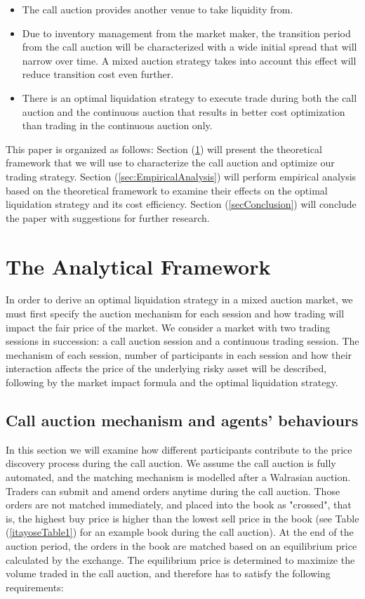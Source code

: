 \documentclass{article}
\begin{document}
\begin{itemize}
  \item The call auction provides another venue to take liquidity from.
  \item Due to inventory management from the market maker, the transition period from the call auction will be characterized with a wide initial spread that will narrow over time. A mixed auction strategy takes into account this effect will reduce transition cost even further.
  \item There is an optimal liquidation strategy to execute trade during both the call auction and the continuous auction that results in better cost optimization than trading in the continuous auction only.
\end{itemize}

This paper is organized as follows: Section (\ref{sec:AnalyticalFramework}) will present the theoretical framework that we will use to characterize the call auction and optimize our trading strategy. Section (\ref{sec:EmpiricalAnalysis}) will perform empirical analysis based on the theoretical framework to examine their effects on the optimal liquidation strategy and its cost efficiency. Section (\ref{secConclusion}) will conclude the paper with suggestions for further research.

\section{The Analytical Framework}\label{sec:AnalyticalFramework}

In order to derive an optimal liquidation strategy in a mixed auction market, we must first specify the auction mechanism for each session and how trading will impact the fair price of the market. We consider a market with two trading sessions in succession: a call auction session and a continuous trading session. The mechanism of each session, number of participants in each session and how their interaction affects the price of the underlying risky asset will be described, following by the market impact formula and the optimal liquidation strategy.

\subsection{Call auction mechanism and agents' behaviours}\label{subsec:AnalyticalFrameworkCallAuction}

In this section we will examine how different participants contribute to the price discovery process during the call auction. We assume the call auction is fully automated, and the matching mechanism is modelled after a Walrasian auction. Traders can submit and amend orders anytime during the call auction. Those orders are not matched immediately, and placed into the book as "crossed", that is, the highest buy price is higher than the lowest sell price in the book (see Table (\ref{itayoseTable1}) for an example book during the call auction). At the end of the auction period, the orders in the book are matched based on an equilibrium price calculated by the exchange. The equilibrium price is determined to maximize the volume traded in the call auction, and therefore has to satisfy the following requirements:
\end{document}

